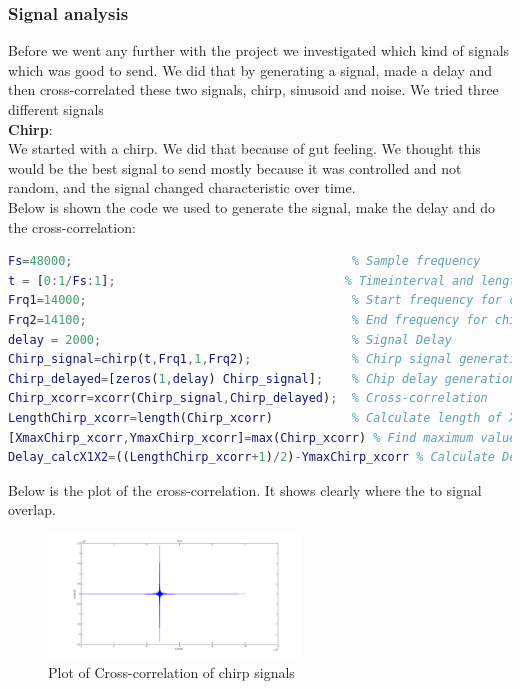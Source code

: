 \subsubsection{Signal analysis}
Before we went any further with the project we investigated which kind of signals which was good to send. We did that by generating a signal, made a delay and then cross-correlated these two signals, chirp, sinusoid and noise.
We tried three different signals\\
\textbf{Chirp}:\\
We started with a chirp. We did that because of gut feeling. We thought this would be the best signal to send mostly because it was controlled and not random, and the signal changed characteristic over time.\\
Below is shown the code we used to generate the signal, make the delay and do the cross-correlation:
\begin{lstlisting}[language=Matlab,frame=lrtb,label=Matlab Code for Chirp Cross-correlation]
Fs=48000;                                       % Sample frequency
t = [0:1/Fs:1];                                % Timeinterval and length
Frq1=14000;                                     % Start frequency for chirp
Frq2=14100;                                     % End frequency for chirp
delay = 2000;                                   % Signal Delay
Chirp_signal=chirp(t,Frq1,1,Frq2);              % Chirp signal generation
Chirp_delayed=[zeros(1,delay) Chirp_signal];    % Chip delay generation
Chirp_xcorr=xcorr(Chirp_signal,Chirp_delayed);  % Cross-correlation
LengthChirp_xcorr=length(Chirp_xcorr)           % Calculate length of Xcorr
[XmaxChirp_xcorr,YmaxChirp_xcorr]=max(Chirp_xcorr) % Find maximum value
Delay_calcX1X2=((LengthChirp_xcorr+1)/2)-YmaxChirp_xcorr % Calculate Delay
\end{lstlisting}
Below is the plot of the cross-correlation. It shows clearly where the to signal overlap.\\
\begin{figure}[H]
\centering
\includegraphics[width=0.6\textwidth]{billeder/chirp_xcorr_fig}
\caption{Plot of Cross-correlation of chirp signals}
\label{fig:chirp_xcorr_plot}
\end{figure}
